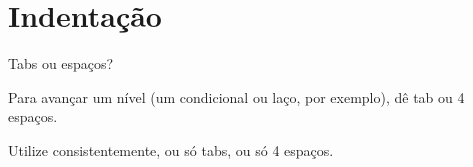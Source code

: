 
\section{Indentação}
\begin{frame}{Tabs ou espaços?}
	
	\Large
	Para avançar um nível (um condicional ou laço, por exemplo), dê tab ou 4 espaços.
	
	\LARGE
	Utilize consistentemente, ou só tabs, ou só 4 espaços.
	
	
	
  \end{frame}
  


